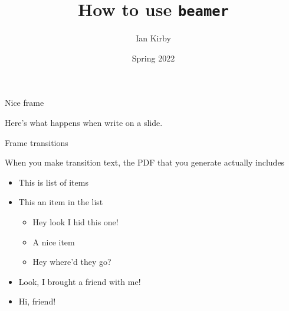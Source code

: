 \documentclass{beamer} %
\title{How to use \texttt{beamer}}
\author{Ian Kirby}
\date{Spring 2022}
\begin{document}
\begin{frame}{}%

    \maketitle
    
\end{frame}



\begin{frame}{Nice frame}

    Here's what happens when write on a slide.
    \bigskip

    

\end{frame}


\begin{frame}{Frame transitions}

When you make transition text, the PDF that you generate actually includes 

\begin{itemize}
    \item<1-> This is list of items %
    \item<2-> This an item in the list %
    \begin{itemize}
        \item<3-4> Hey look I hid this one!
        \item<4-4> A nice item
        \item<5-> Hey where'd they go?
    \end{itemize}
    \item<6-> Look, I brought a friend with me! %
    \item<6-> Hi, friend! 
\end{itemize}

    
\end{frame}
\end{document}
